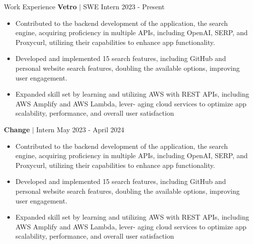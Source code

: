 \documentclass{resume} %
\begin{document}
\begin{rSection}{Work Experience}
{\textbf{Vetro} $\vert$ SWE Intern} \hfill 2023 - Present \\\vspace{-1.5em}
\begin{itemize}
\item Contributed to the backend development of the application, the search engine, acquiring proficiency in multiple APIs, including OpenAI, SERP, and Proxycurl, utilizing their capabilities to enhance app functionality.
\vspace{-0.4em}
\item Developed and implemented 15 search features, including GitHub and personal website search features, doubling the available options, improving user engagement.
\vspace{-0.4em}
\item Expanded skill set by learning and utilizing AWS with REST APIs, including AWS Amplify and AWS Lambda, lever- aging cloud services to optimize app scalability, performance, and overall user satisfaction
\vspace{-0.4em}
\end{itemize}
{\textbf{Change} $\vert$ Intern} \hfill May 2023 - April 2024 \\\vspace{-1.5em}
\begin{itemize}
\item Contributed to the backend development of the application, the search engine, acquiring proficiency in multiple APIs, including OpenAI, SERP, and Proxycurl, utilizing their capabilities to enhance app functionality.
\vspace{-0.4em}
\item Developed and implemented 15 search features, including GitHub and personal website search features, doubling the available options, improving user engagement.
\vspace{-0.4em}
\item Expanded skill set by learning and utilizing AWS with REST APIs, including AWS Amplify and AWS Lambda, lever- aging cloud services to optimize app scalability, performance, and overall user satisfaction
\vspace{-0.4em}
\end{itemize}
\end{rSection}


\end{document}
